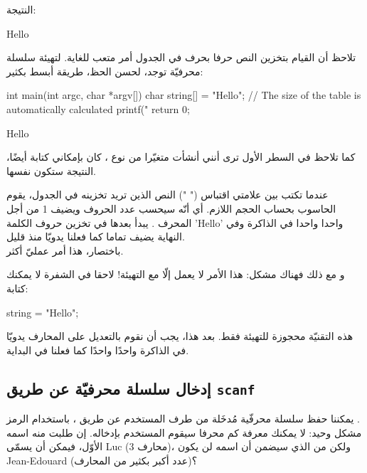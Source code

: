 النتيجة:

\begin{Console}
Hello
\end{Console}

تلاحظ أن القيام بتخزين النص حرفا بحرف في الجدول
أمر متعب للغاية. لتهيئة سلسلة محرفيّة توجد، لحسن الحظ، طريقة أبسط بكثير:

\begin{Csource}
int main(int argc, char *argv[])
{
	char string[] = "Hello"; // The size of the table is automatically calculated
	printf("%
	return 0;
}
\end{Csource}

\begin{Console}
Hello
\end{Console}

كما تلاحظ في السطر الأول ترى أنني أنشأت متغيّرا من نوع
،
كان بإمكاني كتابة
أيضًا، النتيجة ستكون نفسها.

عندما تكتب بين علامتي اقتباس (" ") النص الذين تريد تخزينه في الجدول، يقوم الحاسوب بحساب الحجم اللازم. أي أنّه سيحسب عدد الحروف ويضيف 1 من أجل المحرف
.
يبدأ بعدها في تخزين حروف الكلمة
'\textenglish{Hello}'
واحدا واحدا في الذاكرة وفي النهاية يضيف
تماما كما فعلنا يدويّا منذ قليل.\\
باختصار، هذا أمر عمليّ أكثر.

و مع ذلك فهناك مشكل: هذا الأمر لا يعمل إلّا مع التهيئة! لاحقا في الشفرة لا يمكنك كتابة:

\begin{Csource}
string = "Hello";
\end{Csource}

هذه التقنيّة محجوزة للتهيئة فقط. بعد هذا، يجب أن نقوم بالتعديل على المحارف يدويّا في الذاكرة واحدًا واحدًا كما فعلنا في البداية.

\subsection{إدخال سلسلة محرفيّة عن طريق \texttt{scanf}}

يمكننا حفظ سلسلة محرفّية مُدخَلة من طرف المستخدم عن طريق
،
باستخدام الرمز
.\\
مشكل وحيد: لا يمكنك معرفة كم محرفا سيقوم المستخدم بإدخاله. إن طلبت منه اسمه الأوّل، فيمكن أن يسمّى
\textenglish{Luc}
(3 محارف)، ولكن من الذي سيضمن أن اسمه لن يكون
\textenglish{Jean-Edouard}
(عدد أكبر بكثير من المحارف)؟

